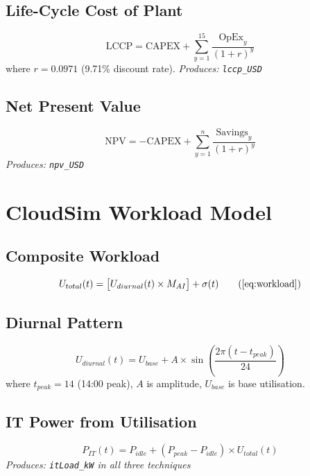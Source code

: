 \documentclass[12pt,a4paper]{report}
\begin{document}
\subsection{Life-Cycle Cost of Plant}
\begin{equation}
\text{LCCP} = \text{CAPEX} + \sum_{y=1}^{15} \frac{\text{OpEx}_y}{(1+r)^y}
\label{eq:lccp}
\end{equation}
where $r = 0.0971$ (9.71\% discount rate). \textit{Produces: \texttt{lccp\_USD}}

\subsection{Net Present Value}
\begin{equation}
\text{NPV} = -\text{CAPEX} + \sum_{y=1}^{n} \frac{\text{Savings}_y}{(1+r)^y}
\label{eq:npv}
\end{equation}
\textit{Produces: \texttt{npv\_USD}}

\section{CloudSim Workload Model}

\subsection{Composite Workload}
\begin{equation}
U_{total}(t) = \bigl[U_{diurnal}(t) \times M_{AI}\bigr] + \sigma(t)
\tag{\ref{eq:workload}}
\end{equation}

\subsection{Diurnal Pattern}
\begin{equation}
U_{diurnal}(t) = U_{base} + A \times \sin\!\left(\frac{2\pi(t - t_{peak})}{24}\right)
\label{eq:diurnal}
\end{equation}
where $t_{peak} = 14$ (14:00 peak), $A$ is amplitude, $U_{base}$ is base utilisation.

\subsection{IT Power from Utilisation}
\begin{equation}
P_{IT}(t) = P_{idle} + (P_{peak} - P_{idle}) \times U_{total}(t)
\label{eq:it_power}
\end{equation}
\textit{Produces: \texttt{itLoad\_kW} in all three techniques}
\end{document}
